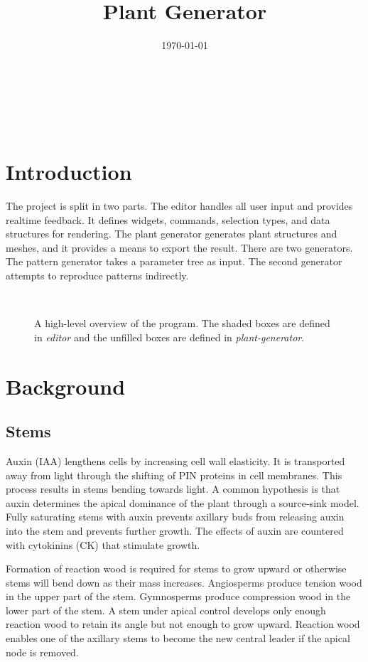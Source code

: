 \documentclass[10pt]{article}
\title{Plant Generator}
\date{\today}
\begin{document}
\begin{center}
  \\
 \vspace{1em}
 \begin{huge} \@title \end{huge} \\
 \vspace{1em}
 \@date
\end{center}
\tableofcontents
\pagebreak

\section{Introduction}
The project is split in two parts. The editor handles all user input and provides realtime feedback. It defines widgets, commands, selection types, and data structures for rendering. The plant generator generates plant structures and meshes, and it provides a means to export the result. There are two generators. The pattern generator takes a parameter tree as input. The second generator attempts to reproduce patterns indirectly.
\begin{figure}[H]
\centering
 \\
\caption{A high-level overview of the program. The shaded boxes are defined in \textit{editor} and the unfilled boxes are defined in \textit{plant-generator}.}
\end{figure}

\section{Background}
\subsection{Stems}
Auxin (IAA) lengthens cells by increasing cell wall elasticity. It is transported away from light through the shifting of PIN proteins in cell membranes. This process results in stems bending towards light. A common hypothesis is that auxin determines the apical dominance of the plant through a source-sink model. Fully saturating stems with auxin prevents axillary buds from releasing auxin into the stem and prevents further growth. The effects of auxin are countered with cytokinins (CK) that stimulate growth.

Formation of reaction wood is required for stems to grow upward or otherwise stems will bend down as their mass increases. Angiosperms produce tension wood in the upper part of the stem. Gymnosperms produce compression wood in the lower part of the stem. A stem under apical control develops only enough reaction wood to retain its angle but not enough to grow upward. Reaction wood enables one of the axillary stems to become the new central leader if the apical node is removed.
\end{document}

